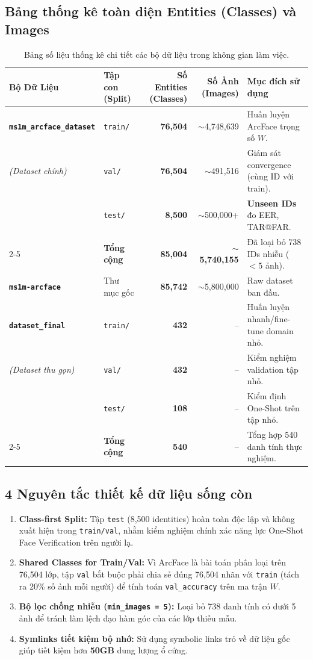 \documentclass[11pt,a4paper]{article}
\begin{document}
\subsection{Bảng thống kê toàn diện Entities (Classes) và Images}
\begin{table}[H]
\centering
\begin{tabular}{l l r r l}
\toprule
\textbf{Bộ Dữ Liệu} & \textbf{Tập con (Split)} & \textbf{Số Entities (Classes)} & \textbf{Số Ảnh (Images)} & \textbf{Mục đích sử dụng} \\
\midrule
\textbf{\texttt{ms1m\_arcface\_dataset}} & \texttt{train/} & \textbf{76,504} & $\sim$4,748,639 & Huấn luyện ArcFace trọng số $W$. \\
\textit{(Dataset chính)} & \texttt{val/} & \textbf{76,504} & $\sim$491,516 & Giám sát convergence (cùng ID với train). \\
& \texttt{test/} & \textbf{8,500} & $\sim$500,000+ & \textbf{Unseen IDs} đo EER, TAR@FAR. \\
\cmidrule{2-5}
& \textbf{Tổng cộng} & \textbf{85,004} & \textbf{$\sim$5,740,155} & Đã loại bỏ 738 IDs nhiễu ($<5$ ảnh). \\
\midrule
\textbf{\texttt{ms1m-arcface}} & Thư mục gốc & \textbf{85,742} & $\sim$5,800,000 & Raw dataset ban đầu. \\
\midrule
\textbf{\texttt{dataset\_final}} & \texttt{train/} & \textbf{432} & -- & Huấn luyện nhanh/fine-tune domain nhỏ. \\
\textit{(Dataset thu gọn)} & \texttt{val/} & \textbf{432} & -- & Kiểm nghiệm validation tập nhỏ. \\
& \texttt{test/} & \textbf{108} & -- & Kiểm định One-Shot trên tập nhỏ. \\
\cmidrule{2-5}
& \textbf{Tổng cộng} & \textbf{540} & -- & Tổng hợp 540 danh tính thực nghiệm. \\
\bottomrule
\end{tabular}
\caption{Bảng số liệu thống kê chi tiết các bộ dữ liệu trong không gian làm việc.}
\end{table}

\subsection{4 Nguyên tắc thiết kế dữ liệu sống còn}
\begin{enumerate}
    \item \textbf{Class-first Split:} Tập \texttt{test} (8,500 identities) hoàn toàn độc lập và không xuất hiện trong \texttt{train/val}, nhằm kiểm nghiệm chính xác năng lực One-Shot Face Verification trên người lạ.
    \item \textbf{Shared Classes for Train/Val:} Vì ArcFace là bài toán phân loại trên 76,504 lớp, tập \texttt{val} bắt buộc phải chia sẻ đúng 76,504 nhãn với \texttt{train} (tách ra 20\% số ảnh mỗi người) để tính toán \texttt{val\_accuracy} trên ma trận $W$.
    \item \textbf{Bộ lọc chống nhiễu (\texttt{min\_images = 5}):} Loại bỏ 738 danh tính có dưới 5 ảnh để tránh làm lệch đạo hàm góc của các lớp thiếu mẫu.
    \item \textbf{Symlinks tiết kiệm bộ nhớ:} Sử dụng symbolic links trỏ về dữ liệu gốc giúp tiết kiệm hơn \textbf{50GB} dung lượng ổ cứng.
\end{enumerate}
\end{document}
